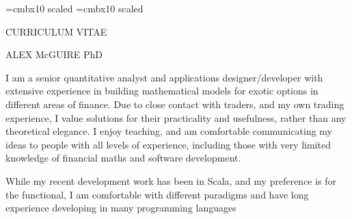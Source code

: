 \font\titlesize=cmbx10 scaled
\font\namesize=cmbx10 scaled
\vsize=10in
\hsize=8in
\voffset -0.4in
\hoffset -0.9in
\vskip 1cm

\centerline{\titlesize CURRICULUM VITAE}
\vskip 0.4in
\centerline{\namesize ALEX McGUIRE PhD}
\vskip 0.2in
\def\jobskip{\noalign{\bigskip}}
\def\posskip{\noalign{\medskip}}

\midinsert

\narrower\narrower\narrower
I am a senior quantitative analyst and applications designer/developer with extensive experience in building mathematical models for exotic options in 
different areas of finance. Due to close contact with traders, and my own trading experience, I value
solutions for their practicality and usefulness, rather than any theoretical elegance. I enjoy teaching, and am comfortable communicating my ideas to people with all
levels of experience, including those with very limited knowledge of financial maths and software development.

While my recent development work has been in Scala, and my preference is for the functional, 
I am comfortable with different paradigms and have long experience developing in many programming languages
\endinsert


